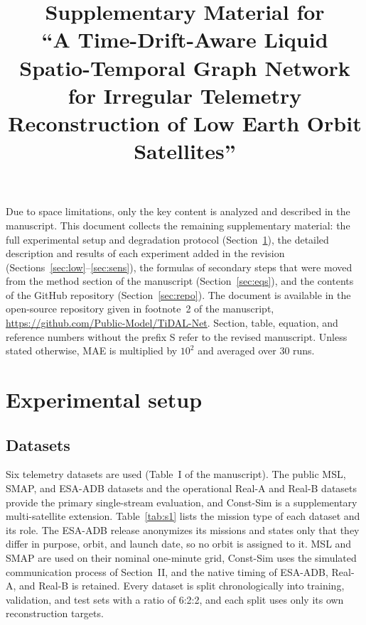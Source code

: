 \documentclass[10pt,a4paper]{article}
\title{Supplementary Material for\\
``A Time-Drift-Aware Liquid Spatio-Temporal Graph Network for Irregular Telemetry Reconstruction of Low Earth Orbit Satellites''}
\date{}
\begin{document}
\maketitle
\vspace{-2.5em}

\noindent Due to space limitations, only the key content is analyzed and described in the manuscript. This document collects the remaining supplementary material: the full experimental setup and degradation protocol (Section~\ref{sec:setup}), the detailed description and results of each experiment added in the revision (Sections~\ref{sec:low}--\ref{sec:sens}), the formulas of secondary steps that were moved from the method section of the manuscript (Section~\ref{sec:eqs}), and the contents of the GitHub repository (Section~\ref{sec:repo}). The document is available in the open-source repository given in footnote~2 of the manuscript, \url{https://github.com/Public-Model/TiDAL-Net}. Section, table, equation, and reference numbers without the prefix S refer to the revised manuscript. Unless stated otherwise, MAE is multiplied by $10^{2}$ and averaged over 30 runs.

\section{Experimental setup}
\label{sec:setup}

\subsection{Datasets}

Six telemetry datasets are used (Table~I of the manuscript). The public MSL, SMAP, and ESA-ADB datasets and the operational Real-A and Real-B datasets provide the primary single-stream evaluation, and Const-Sim is a supplementary multi-satellite extension. Table~\ref{tab:s1} lists the mission type of each dataset and its role. The ESA-ADB release anonymizes its missions and states only that they differ in purpose, orbit, and launch date, so no orbit is assigned to it. MSL and SMAP are used on their nominal one-minute grid, Const-Sim uses the simulated communication process of Section~II, and the native timing of ESA-ADB, Real-A, and Real-B is retained. Every dataset is split chronologically into training, validation, and test sets with a ratio of 6:2:2, and each split uses only its own reconstruction targets.
\end{document}

